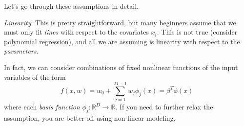 Let's go through these assumptions in detail.  

\textit{Linearity}: This is pretty straightforward, but many beginners assume that we must only fit \textit{lines} with respect to the covariates $x_i$. This is not true (consider polynomial regression), and all we are assuming is linearity with respect to the \textit{parameters}. 

In fact, we can consider combinations of fixed nonlinear functions of the input variables of the form
\begin{equation}
  f(x, w) = w_0 + \sum_{j=1}^{M-1} w_j \phi_j (x) = \beta^T \phi(x)
\end{equation}
where each \textit{basis function} $\phi_j: \mathbb{R}^D \to \mathbb{R}$. If you need to further relax the assumption, you are better off using non-linear modeling. 

